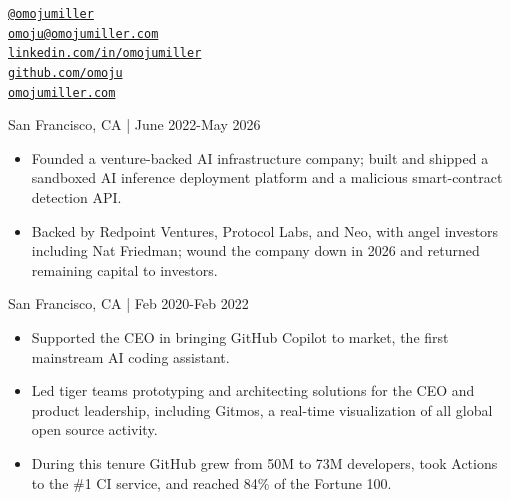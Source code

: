 \documentclass[11pt,article,oneside]{memoir}
\makeatletter
\def\myemail{omoju@omojumiller.com}
\def\myweb{omojumiller.com}
\def\mytwitter{@omojumiller}
\def\mylinkedin{linkedin.com/in/omojumiller}
\def\mygithub{github.com/omoju}
\makeatother
\begin{document}
\begin{minipage}[t]{2.95in}

\end{minipage}
\hfill
\hfill
\begin{minipage}[t]{2in}
  \flushright \footnotesize  \addressblock
  {\scriptsize  \texttt{\href{http://twitter.com/omojumiller}{\mytwitter}} \, \faTwitter }  \\
  {\scriptsize  \texttt{\href{mailto:\myemail}{\myemail}} \, \faEnvelope} \\
  {\scriptsize  \texttt{\href{\mylinkedin}{\mylinkedin}} \, \faLinkedin} \\
  {\scriptsize  \texttt{\href{\mygithub}{\mygithub}} \, \faGithub} \\
  {\scriptsize  \texttt{\href{\myweb}{\myweb}} \, \faGlobe}
\end{minipage}

\medskip


\bigskip       
{}
\reversemarginpar



\medskip

 \hfill San Francisco, CA | June 2022-May 2026
\begin{itemize}[nolistsep]
\item[-] Founded a venture-backed AI infrastructure company; built and shipped a sandboxed AI inference deployment platform and a malicious smart-contract detection API.
\item[-] Backed by Redpoint Ventures, Protocol Labs, and Neo, with angel investors including Nat Friedman; wound the company down in 2026 and returned remaining capital to investors.
\end{itemize} 

 \hfill San Francisco, CA | Feb 2020-Feb 2022
\begin{itemize}[nolistsep]
\item[-]Supported the CEO in bringing GitHub Copilot to market, the first mainstream AI coding assistant.
\item[-]Led tiger teams prototyping and architecting solutions for the CEO and product leadership, including Gitmos, a real-time visualization of all global open source activity.
\item[-]During this tenure GitHub grew from 50M to 73M developers, took Actions to the \#1 CI service, and reached 84\% of the Fortune 100.
\end{itemize} 
\end{document}
